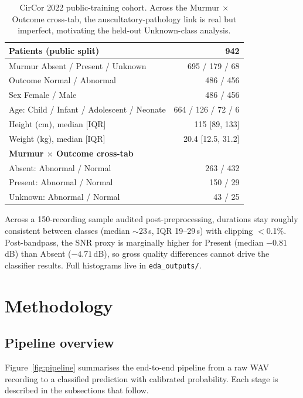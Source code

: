 \documentclass[10pt,twocolumn]{article}
\begin{document}
\begin{table}[!htbp]
\centering
\caption{CirCor 2022 public-training cohort. Across the Murmur $\times$ Outcome cross-tab, the auscultatory-pathology link is real but imperfect, motivating the held-out Unknown-class analysis.}
\label{tab:eda}
\small
\begin{tabular}{lr}
\toprule
\textbf{Patients (public split)}        & 942 \\
\midrule
Murmur Absent / Present / Unknown       & 695 / 179 / 68 \\
Outcome Normal / Abnormal               & 486 / 456 \\
Sex Female / Male                       & 486 / 456 \\
Age: Child / Infant / Adolescent / Neonate     & 664 / 126 / 72 / 6 \\
Height (cm), median [IQR]               & 115 [89, 133] \\
Weight (kg), median [IQR]               & 20.4 [12.5, 31.2] \\
\midrule
\multicolumn{2}{l}{\textbf{Murmur $\times$ Outcome cross-tab}} \\
\quad Absent: Abnormal / Normal           & 263 / 432 \\
\quad Present: Abnormal / Normal           & 150 / 29  \\
\quad Unknown: Abnormal / Normal           & 43 / 25   \\
\bottomrule
\end{tabular}
\end{table}

Across a 150-recording sample audited post-preprocessing, durations stay roughly consistent between classes (median $\sim$23\,s, IQR 19--29\,s) with clipping $<$0.1\%. Post-bandpass, the SNR proxy is marginally higher for Present (median $-0.81$\,dB) than Absent ($-4.71$\,dB), so gross quality differences cannot drive the classifier results. Full histograms live in \texttt{eda\_outputs/}.

\section{Methodology}

\subsection{Pipeline overview}

Figure~\ref{fig:pipeline} summarises the end-to-end pipeline from a raw WAV recording to a classified prediction with calibrated probability. Each stage is described in the subsections that follow.
\end{document}

